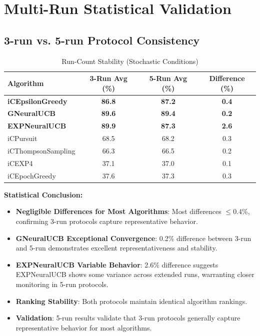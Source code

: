 \documentclass[12pt,a4paper]{article}
\newcommand{\success}[1]{\textcolor{accentgreen}{\textbf{#1}}}
\newcommand{\legacy}[1]{\textcolor{legacycolor}{\textbf{#1}}}
\newcommand{\neural}[1]{\textcolor{neuralcolor}{\textbf{#1}}}
\begin{document}
\section{Multi-Run Statistical Validation}

\subsection{3-run vs. 5-run Protocol Consistency}

\begin{table}[H]
\centering
\caption{Run-Count Stability (Stochastic Conditions)}
\label{tab:run-count}
\begin{tabular}{@{}lccc@{}}
\toprule
\textbf{Algorithm} & \textbf{3-Run Avg (\%)} & \textbf{5-Run Avg (\%)} & \textbf{Difference (\%)} \\
\midrule
\success{iCEpsilonGreedy}   & \success{86.8} & \success{87.2} & \success{0.4} \\
\neural{GNeuralUCB}        & \neural{89.6} & \neural{89.4} & \neural{0.2} \\
\legacy{EXPNeuralUCB}       & \legacy{89.9} & \legacy{87.3} & \legacy{2.6} \\
iCPursuit                   & 68.5 & 68.2 & 0.3 \\
iCThompsonSampling          & 66.3 & 66.5 & 0.2 \\
iCEXP4                      & 37.1 & 37.0 & 0.1 \\
iCEpochGreedy               & 37.6 & 37.3 & 0.3 \\
\bottomrule
\end{tabular}
\end{table}

\textbf{Statistical Conclusion:}
\begin{itemize}
\item \success{Negligible Differences for Most Algorithms}: Most differences $\leq$0.4\%, confirming 3-run protocols capture representative behavior.
\item \neural{GNeuralUCB Exceptional Convergence}: 0.2\% difference between 3-run and 5-run demonstrates excellent representativeness and stability.
\item \legacy{EXPNeuralUCB Variable Behavior}: 2.6\% difference suggests EXPNeuralUCB shows some variance across extended runs, warranting closer monitoring in 5-run protocols.
\item \success{Ranking Stability}: Both protocols maintain identical algorithm rankings.
\item \success{Validation}: 5-run results validate that 3-run protocols generally capture representative behavior for most algorithms.
\end{itemize}
\end{document}
